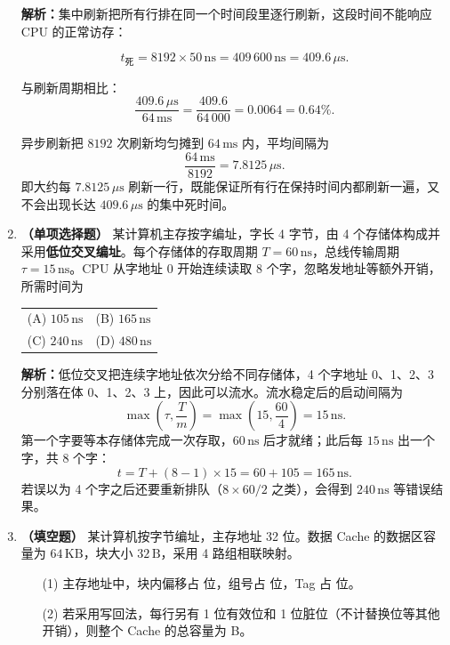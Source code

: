 \begin{enumerate}[leftmargin=*]
\ifshowsolutions\par\noindent\textbf{解析：}集中刷新把所有行排在同一个时间段里逐行刷新，这段时间不能响应 CPU 的正常访存：

\[
t_{\text{死}}=8192\times 50\,\mathrm{ns}=409\,600\,\mathrm{ns}=409.6\,\mu\mathrm{s}.
\]

与刷新周期相比：
\[
\frac{409.6\,\mu\mathrm{s}}{64\,\mathrm{ms}}=\frac{409.6}{64\,000}=0.0064=0.64\%.
\]

异步刷新把 $8192$ 次刷新均匀摊到 $64\,\mathrm{ms}$ 内，平均间隔为
\[
\frac{64\,\mathrm{ms}}{8192}=7.8125\,\mu\mathrm{s}.
\]
即大约每 $7.8125\,\mu\mathrm{s}$ 刷新一行，既能保证所有行在保持时间内都刷新一遍，又不会出现长达 $409.6\,\mu\mathrm{s}$ 的集中死时间。\else \answerarea[6] \fi

\item \textbf{（单项选择题）} 某计算机主存按字编址，字长 4 字节，由 4 个存储体构成并采用\textbf{低位交叉编址}。每个存储体的存取周期 $T=60\,\mathrm{ns}$，总线传输周期 $\tau=15\,\mathrm{ns}$。CPU 从字地址 0 开始连续读取 8 个字，忽略发地址等额外开销，所需时间为

\begin{center}
\begin{tabular}{ll}
(A) $105\,\mathrm{ns}$ & (B) $165\,\mathrm{ns}$ \\[4pt]
(C) $240\,\mathrm{ns}$ & (D) $480\,\mathrm{ns}$
\end{tabular}
\end{center}

\ifshowsolutions\par\noindent\textbf{解析：}低位交叉把连续字地址依次分给不同存储体，4 个字地址 0、1、2、3 分别落在体 0、1、2、3 上，因此可以流水。流水稳定后的启动间隔为
\[
\max\left(\tau,\frac{T}{m}\right)=\max\left(15,\frac{60}{4}\right)=15\,\mathrm{ns}.
\]
第一个字要等本存储体完成一次存取，$60\,\mathrm{ns}$ 后才就绪；此后每 $15\,\mathrm{ns}$ 出一个字，共 8 个字：
\[
t=T+(8-1)\times 15=60+105=165\,\mathrm{ns}.
\]
若误以为 4 个字之后还要重新排队（$8\times 60/2$ 之类），会得到 $240\,\mathrm{ns}$ 等错误结果。\else \answerarea \fi

\item \textbf{（填空题）} 某计算机按字节编址，主存地址 32 位。数据 Cache 的数据区容量为 $64\,\mathrm{KB}$，块大小 $32\,\mathrm{B}$，采用 4 路组相联映射。
\begin{enumerate}
    \item[(1)] 主存地址中，块内偏移占 \underline{\hspace{0.9cm}} 位，组号占 \underline{\hspace{0.9cm}} 位，Tag 占 \underline{\hspace{0.9cm}} 位。
    \item[(2)] 若采用写回法，每行另有 1 位有效位和 1 位脏位（不计替换位等其他开销），则整个 Cache 的总容量为 \underline{\hspace{1.6cm}} B。
\end{enumerate}


\end{enumerate}
